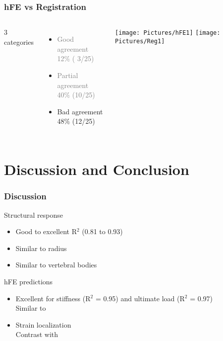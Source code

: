 \documentclass[xcolor=table,11pt]{beamer}
\begin{document}
	\begin{frame}[noframenumbering]
		\frametitle{hFE vs Registration}
		\centering
		\vspace{2mm}
		\begin{columns}
			\vfill
			3 categories\\
			\vfill
			\begin{itemize}
				\item \textcolor{gray}{Good agreement\\12\% ( 3/25)}
				\item \textcolor{gray}{Partial agreement\\40\% (10/25)}
				\item Bad agreement\\48\% (12/25)
			\end{itemize}
			\vfill

			\centering
			\texttt{[image: Pictures/hFE1]}\vspace{5mm}
			\texttt{[image: Pictures/Reg1]}
		\end{columns}
	\end{frame}

	
	\section{Discussion and Conclusion}

	\begin{frame}
		\frametitle{Discussion}

		Structural response
		\begin{itemize}
			\item Good to excellent R$^2$ (0.81 to 0.93)
			\item Similar to radius \cite{p1}\cite{p2}
			\item Similar to vertebral bodies \cite{p3}\cite{p3}
		\end{itemize}

		\vfill

		hFE predictions
		\begin{itemize}
			\item Excellent for stiffness (R$^2$ = 0.95) and ultimate load (R$^2$ = 0.97)\\Similar to \cite{p1}\cite{p3}
			\item Strain localization\\Contrast with \cite{p1}
		\end{itemize}

	\end{frame}
	
\end{document}
